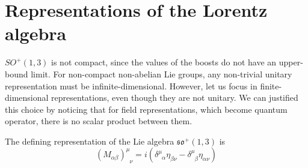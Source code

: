 \section{Representations of the Lorentz algebra}

    $SO^+(1,3)$ is not compact, since the values of the boosts do not have an upper-bound limit. For non-compact non-abelian Lie groups, any non-trivial unitary representation must be infinite-dimensional. However, let us focus in finite-dimensional representations, even though they are not unitary. We can justified this choice by noticing that for field representations, which become quantum operator, there is no scalar product between them. 

    The defining representation of the Lie algebra $\mathfrak{so}^+(1,3)$ is 
    \begin{equation*}
        (M_{\alpha\beta})^\mu_{\phantom \mu \nu} = i (\delta^\mu_{\phantom \mu \alpha} \eta_{\beta \nu} - \delta^\mu_{\phantom \mu \beta} \eta_{\alpha \nu})
    \end{equation*}

